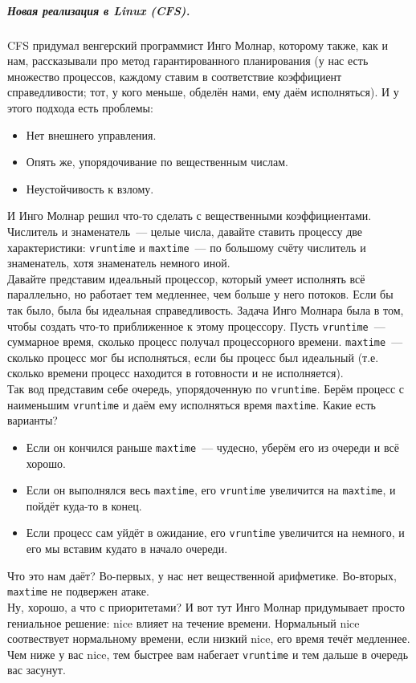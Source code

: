 \documentclass{article}
\begin{document}
    \subparagraph{Новая реализация в Linux (CFS).}
    CFS придумал венгерский программист Инго Молнар, которому также, как и нам, рассказывали про метод гарантированного планирования (у нас есть множество процессов, каждому ставим в соответствие коэффициент справедливости; тот, у кого меньше, обделён нами, ему даём исполняться). И у этого подхода есть проблемы:
    \begin{itemize}
        \item Нет внешнего управления.
        \item Опять же, упорядочивание по вещественным числам.
        \item Неустойчивость к взлому.
    \end{itemize}
    И Инго Молнар решил что-то сделать с вещественными коэффициентами. Числитель и знаменатель~--- целые числа, давайте ставить процессу две характеристики: \Verb|vruntime| и \Verb|maxtime|~--- по большому счёту числитель и знаменатель, хотя знаменатель немного иной.\\
    Давайте представим идеальный процессор, который умеет исполнять всё параллельно, но работает тем медленнее, чем больше у него потоков. Если бы так было, была бы идеальная справедливость. Задача Инго Молнара была в том, чтобы создать что-то приближенное к этому процессору. Пусть \Verb|vruntime|~--- суммарное время, сколько процесс получал процессорного времени. \Verb|maxtime|~--- сколько процесс мог бы исполняться, если бы процесс был идеальный (т.е. сколько времени процесс находится в готовности и не исполняется).\\
    Так вод представим себе очередь, упорядоченную по \Verb|vruntime|. Берём процесс с наименьшим \Verb|vruntime| и даём ему исполняться время \Verb|maxtime|. Какие есть варианты?
    \begin{itemize}
        \item Если он кончился раньше \Verb|maxtime|~--- чудесно, уберём его из очереди и всё хорошо.
        \item Если он выполнялся весь \Verb|maxtime|, его \Verb|vruntime| увеличится на \Verb|maxtime|, и пойдёт куда-то в конец.
        \item Если процесс сам уйдёт в ожидание, его \Verb|vruntime| увеличится на немного, и его мы вставим кудато в начало очереди.
    \end{itemize}
    Что это нам даёт? Во-первых, у нас нет вещественной арифметике. Во-вторых, \Verb|maxtime| не подвержен атаке.\\
    Ну, хорошо, а что с приоритетами? И вот тут Инго Молнар придумывает просто гениальное решение: nice влияет на течение времени. Нормальный nice соотвествует нормальному времени, если низкий nice, его время течёт медленнее. Чем ниже у вас nice, тем быстрее вам набегает \Verb|vruntime| и тем дальше в очередь вас засунут.\\
\end{document}
